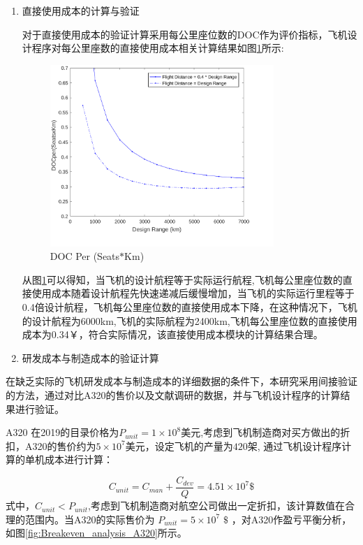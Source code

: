\documentclass[12pt,a4paper]{report}
\begin{document}
\begin{enumerate}
\item 直接使用成本的计算与验证

对于直接使用成本的验证计算采用每公里座位数的DOC作为评价指标，飞机设计程序对每公里座数的直接使用成本相关计算结果如图\ref{fig:g34}所示:

\begin{figure}[H]
	\centering
		\includegraphics[width=0.8\textwidth]{./media3/image17.pdf}
		\caption{DOC Per (Seats$\ast$Km)}
		\label{fig:g34}
\end{figure}

从图\ref{fig:g34}可以得知，当飞机的设计航程等于实际运行航程,飞机每公里座位数的直接使用成本随着设计航程先快速递减后缓慢增加，当飞机的实际运行里程等于0.4倍设计航程，飞机每公里座位数的直接使用成本下降，在这种情况下，飞机的设计航程为6000km,飞机的实际航程为2400km,飞机每公里座位数的直接使用成本为0.34￥，符合实际情况，该直接使用成本模块的计算结果合理。

\item 研发成本与制造成本的验证计算
\end{enumerate}

在缺乏实际的飞机研发成本与制造成本的详细数据的条件下，本研究采用间接验证的方法，通过对比A320的售价以及文献调研的数据，并与飞机设计程序的计算结果进行验证。

A320 在2019的目录价格为$P_{unit}=1\times 10^8$美元,考虑到飞机制造商对买方做出的折扣，A320的售价约为$5\times 10^7$美元，设定飞机的产量为$420$架, 通过飞机设计程序计算的单机成本进行计算：

\begin{equation}
C_{unit}=C_{man}+\frac{C_{dev}}{Q}=4.51\times 10^7 \$
\end{equation}
式中，$ C_{unit}<P_{unit}$,考虑到飞机制造商对航空公司做出一定折扣，该计算数值在合理的范围内。当A320的实际售价为 $ P_{unit}=5 \times 10^{7} $ $\$$ ，对A320作盈亏平衡分析，如图\ref{fig:Breakeven_analysis_A320}所示。
\end{document}
